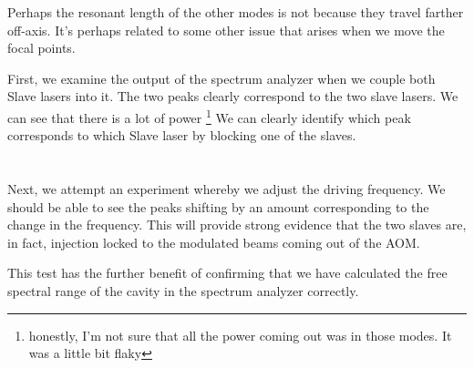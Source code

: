 Perhaps the resonant length of the other modes is not because they travel farther off-axis. It's perhaps related to some other issue that arises when we move the focal points.




First, we examine the output of the spectrum analyzer when we couple both Slave lasers into it. 
The two peaks clearly correspond to the two slave lasers. We can see that there is a lot of power \footnote{honestly, I'm not sure that all the power coming out was in those modes. It was a little bit flaky}
We can clearly identify which peak corresponds to which Slave laser by blocking one of the slaves. 

\section{}

Next, we attempt an experiment whereby we adjust the driving frequency. We should be able to see the peaks shifting by an amount corresponding to the change in the frequency. This will provide strong evidence that the two slaves are, in fact, injection locked to the modulated beams coming out of the AOM. 

This test has the further benefit of confirming that we have calculated the free spectral range of the cavity in the spectrum analyzer correctly. 


